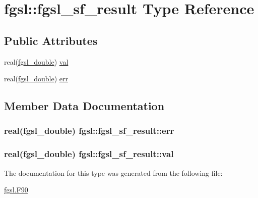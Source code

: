 \hypertarget{structfgsl_1_1fgsl__sf__result}{}\section{fgsl\+:\+:fgsl\+\_\+sf\+\_\+result Type Reference}
\label{structfgsl_1_1fgsl__sf__result}
\subsection*{Public Attributes}
\begin{DoxyCompactItemize}
\item 
real(\hyperlink{namespacefgsl_a9af5113378e0f000eb479d3f90196ddf}{fgsl\+\_\+double}) \hyperlink{structfgsl_1_1fgsl__sf__result_a7a6ae6b70ef97531a1dd832ef464c1cf}{val}
\item 
real(\hyperlink{namespacefgsl_a9af5113378e0f000eb479d3f90196ddf}{fgsl\+\_\+double}) \hyperlink{structfgsl_1_1fgsl__sf__result_a2b5edd0ba1fd8b8cf9998c6422365671}{err}
\end{DoxyCompactItemize}


\subsection{Member Data Documentation}
\hypertarget{structfgsl_1_1fgsl__sf__result_a2b5edd0ba1fd8b8cf9998c6422365671}{}
\subsubsection[{err}]{\setlength{\rightskip}{0pt plus 5cm}real({\bf fgsl\+\_\+double}) fgsl\+::fgsl\+\_\+sf\+\_\+result\+::err}\label{structfgsl_1_1fgsl__sf__result_a2b5edd0ba1fd8b8cf9998c6422365671}
\hypertarget{structfgsl_1_1fgsl__sf__result_a7a6ae6b70ef97531a1dd832ef464c1cf}{}
\subsubsection[{val}]{\setlength{\rightskip}{0pt plus 5cm}real({\bf fgsl\+\_\+double}) fgsl\+::fgsl\+\_\+sf\+\_\+result\+::val}\label{structfgsl_1_1fgsl__sf__result_a7a6ae6b70ef97531a1dd832ef464c1cf}


The documentation for this type was generated from the following file\+:\begin{DoxyCompactItemize}
\item 
\hyperlink{fgsl_8F90}{fgsl.\+F90}\end{DoxyCompactItemize}
